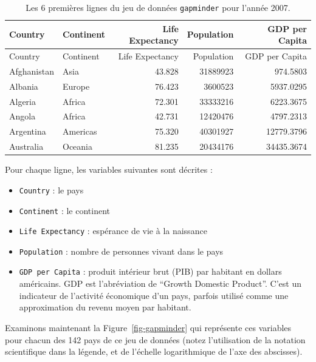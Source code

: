 \documentclass[
  a4paper,
  DIV=11,
  numbers=noendperiod,
  oneside]{scrreprt}
\providecommand{\tightlist}{%
  \setlength{\itemsep}{0pt}\setlength{\parskip}{0pt}}\usepackage{longtable,booktabs,array}
\begin{document}
\begin{longtable}[]{@{}llrrr@{}}
\caption{Les 6 premières lignes du jeu de données \texttt{gapminder}
pour l'année 2007.}\tabularnewline
\toprule\noalign{}
Country & Continent & Life Expectancy & Population & GDP per Capita \\
\midrule\noalign{}
\endfirsthead
\toprule\noalign{}
Country & Continent & Life Expectancy & Population & GDP per Capita \\
\midrule\noalign{}
\endhead
\bottomrule\noalign{}
\endlastfoot
Afghanistan & Asia & 43.828 & 31889923 & 974.5803 \\
Albania & Europe & 76.423 & 3600523 & 5937.0295 \\
Algeria & Africa & 72.301 & 33333216 & 6223.3675 \\
Angola & Africa & 42.731 & 12420476 & 4797.2313 \\
Argentina & Americas & 75.320 & 40301927 & 12779.3796 \\
Australia & Oceania & 81.235 & 20434176 & 34435.3674 \\
\end{longtable}

Pour chaque ligne, les variables suivantes sont décrites :

\begin{itemize}
\tightlist
\item
  \texttt{Country} : le pays
\item
  \texttt{Continent} : le continent
\item
  \texttt{Life\ Expectancy} : espérance de vie à la naissance
\item
  \texttt{Population} : nombre de personnes vivant dans le pays
\item
  \texttt{GDP\ per\ Capita} : produit intérieur brut (PIB) par habitant
  en dollars américains. GDP est l'abréviation de ``Growth Domestic
  Product''. C'est un indicateur de l'activité économique d'un pays,
  parfois utilisé comme une approximation du revenu moyen par habitant.
\end{itemize}

Examinons maintenant la Figure~\ref{fig-gapminder} qui représente ces
variables pour chacun des 142 pays de ce jeu de données (notez
l'utilisation de la notation scientifique dans la légende, et de
l'échelle logarithmique de l'axe des abscisses).
\end{document}
